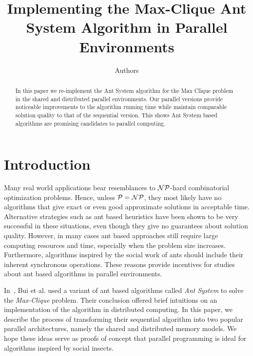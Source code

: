 \documentclass[11pt]{article}
\begin{document}
  

\title{Implementing the Max-Clique Ant System Algorithm in Parallel Environments} 
\author{
Authors\\
}  
\maketitle  
 

\begin{abstract}
In this paper we re-implement the Ant System algorithm for the Max Clique problem~\cite{BR} in the shared and distributed parallel environments. Our parallel versions provide noticeable improvements to the algorithm running time while maintain comparable solution quality to that of the sequential version.  This shows Ant System based algorithms are promising candidates to parallel computing.
\end{abstract}


\section{Introduction}\label{intro}


Many real world applications bear resemblances to  $\cal NP$-hard combinatorial optimization problems.  Hence, unless $\cal P = NP$, they most likely have no algorithms that give exact or even good approximate solutions in acceptable time.  Alternative strategies such as ant based heuristics  have been shown to be very successful in these situations, even though they give no guarantees about solution quality.  However, in many cases ant based approaches still require large computing resources and time, especially when the problem size increases.  Furthermore, algorithms inspired by the social work of ants should  include their inherent synchronous operations.  These reasons provide incentives for studies about ant based algorithms in parallel environments.

In~\cite{BR}, Bui et al. used a variant of ant based algorithms called \textit{Ant System} to solve the \textit{Max-Clique} problem. Their conclusion offered brief intuitions on an implementation of the algorithm in distributed computing.  In this paper, we describe the process of transforming their sequential algorithm into two popular parallel architectures, namely the shared and distributed memory models. We hope these ideas serve as proofs of concept that parallel programming is ideal for algorithms inspired by social insects. %
\end{document}
